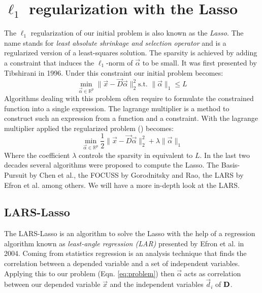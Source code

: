\section { $\ell_1$ regularization with the Lasso}
The $\ell_1$ regularization of our initial problem is also known as the
\emph{Lasso}. The name stands for \emph{least absolute shrinkage and
selection operator} and is a regularized version of a least-squares
solution. The sparsity is achieved by adding a constraint that induces
the $\ell_1$-norm of $\vec{\alpha}$ to be small. It was first
presented by Tibshirani
in 1996\cite{Tibshirani1996}. Under this constraint our initial problem becomes:
\begin{equation}
\min_{\vec{\alpha}\in\mathbb{R}^{p}} \lVert \vec{x} - \vec{D}\vec{\alpha}
\rVert^{2}_{2} \textrm{
s.t. } \lVert \vec{\alpha} \rVert_{1} \leq L \label{eq:l1}
\end{equation}
Algorithms dealing with this problem often require to formulate the
constrained function into a single expression. The lagrange multiplier is a
method to construct such an expression from a function and a constraint. With
the lagrange multiplier applied the regularized problem ()
becomes:
\begin{equation}
\min_{\vec{\alpha}\in\mathbb{R}^{p}}  \frac{1}{2} \lVert \vec{x} -
\vec{D}\vec{\alpha} \rVert^{2}_{2} +
\lambda \lVert \vec{\alpha} \rVert_{1}\label{eq:l1lagrange}
\end{equation}
Where the coefficient $\lambda$ controls the sparsity in equivalent to $L$.
In the last two decades several algorithms were proposed to compute the
Lasso. The Basis-Pursuit by Chen et al.\cite{Chen1995}, the
FOCUSS by Gorodnitsky and Rao\cite{FOCUSS}, the LARS by Efron et
al.\cite{Efron2004} among others. We will have a more in-depth look at the LARS.



\subsection{LARS-Lasso}
\label{sec:lars}
The LARS-Lasso is an algorithm to solve the Lasso with the help of a regression
algorithm known as \emph{least-angle regression (LAR)} presented by
Efron et al.\cite{Efron2004} in 2004. 
Coming from statistics regression is an analysis technique that
finds the correlation between a depended variable and a set of
independent variables. Applying this to our problem (Eqn. \ref{eq:problem})
then $\vec{\alpha}$ acts as correlation between our depended variable
$\vec{x}$ and the independent variables $\vec{d}_i$ of $\boldsymbol{\mathrm{D}}$. 


